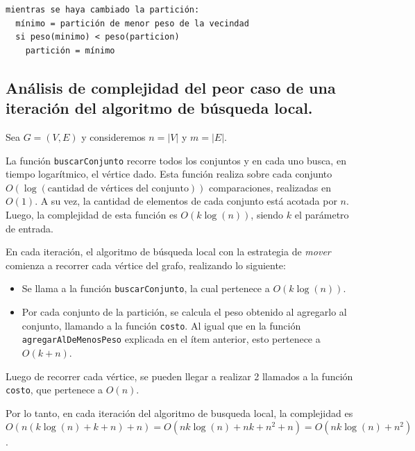 \begin{verbatim}
mientras se haya cambiado la partición:
  mínimo = partición de menor peso de la vecindad
  si peso(minimo) < peso(particion)
    partición = mínimo
\end{verbatim}



\newpage
\subsection{Análisis de complejidad del peor caso de una iteración del
            algoritmo de búsqueda local.}
\vspace*{0.3cm}

Sea $G = (V,E)$ y consideremos $n = |V|$ y $m = |E|$.

La función \texttt{buscarConjunto} recorre todos los conjuntos y en cada uno
busca, en tiempo logarítmico, el vértice dado. Esta función realiza sobre cada
conjunto $O(\log(\text{cantidad de vértices del conjunto}))$ comparaciones,
realizadas en $O(1)$. A su vez, la cantidad de elementos de cada conjunto está
acotada por $n$. Luego, la complejidad de esta función es $O(k\log(n))$, siendo
$k$ el parámetro de entrada.

\vspace*{0.3cm}

En cada iteración, el algoritmo de búsqueda local con la estrategia de
\textit{mover} comienza a recorrer cada vértice del grafo, realizando lo siguiente:
\begin{itemize}
  \item Se llama a la función \texttt{buscarConjunto}, la cual pertenece a
  $O(k\log(n))$.

  \item Por cada conjunto de la partición, se calcula el peso obtenido al
  agregarlo al conjunto, llamando a la función \texttt{costo}. Al igual que en
  la función \texttt{agregarAlDeMenosPeso} explicada en el ítem anterior, esto
  pertenece a $O(k + n)$.
\end{itemize}

Luego de recorrer cada vértice, se pueden llegar a realizar 2 llamados a
la función \texttt{costo}, que pertenece a $O(n)$.

Por lo tanto, en cada iteración del algoritmo de busqueda local, la complejidad
es $O(n (k\log(n) + k + n) + n) = O(nk\log(n) + nk + n^2 + n) = O(nk\log(n) +
n^2)$.

\vspace*{0.3cm}

